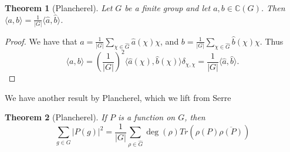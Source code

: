 \documentclass[]{article}
\newtheorem{theorem}{Theorem}
\theoremstyle{definition}
\numberwithin{theorem}{section}
\numberwithin{equation}{section}
\begin{document}
\begin{theorem}[Plancherel]
	\label{thm:Plancherel}
	Let $G$ be a finite group and let $a, b \in \mathbb{C}(G)$. Then $\langle a, b \rangle = \frac{1}{|G|} \langle \widehat{a}, \widehat{b} \rangle$. 
\end{theorem}
\begin{proof}
	We have that $a =\frac{1}{|G|} \sum_{\chi \in \widehat{G}} \widehat{a}(\chi) \chi$, and $b = \frac{1}{|G|} \sum_{\chi \in \widehat{G}} \widehat{b}(\chi) \chi$. Thus \begin{equation}
		\langle a, b \rangle = \left(\frac{1}{|G|}\right)^2 \langle \widehat{a}(\chi), \widehat{b}(\chi) \rangle \delta_{\chi, \chi} = \frac{1}{|G|} \langle \widehat{a}, \widehat{b} \rangle.
	\end{equation}

\end{proof}
We have another result by Plancherel, which we lift from Serre \cite{serreExamples1977}
\begin{theorem}[Plancherel]\label{lem:Plancharel formula}
	If $P$ is a function on $G$, then
	\begin{equation}
		\sum_{g \in G}|P(g)|^2 = \frac{1}{|G|} \sum_{\rho \in \widehat{G}} \deg(\rho) Tr(\rho(P) \overline{\rho(P)}) 
	\end{equation}
\end{theorem}
\end{document}
